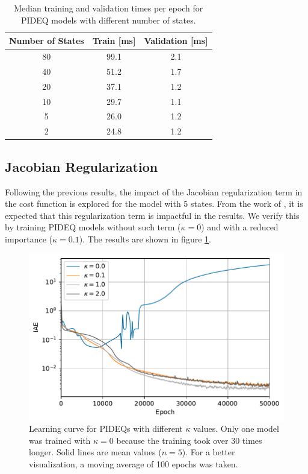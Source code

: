 \begin{table}[h]
    \centering
    \caption{Median training and validation times per epoch for \gls{PIDEQ} models with different number of states.}
    \label{tab:n-states-times}
    \begin{tabular}{ccc}
	\toprule
	\textbf{Number of States} & \textbf{Train} [ms] & \textbf{Validation} [ms] \\ \midrule
	80       & 99.1       & 2.1             \\
	40       & 51.2       & 1.7             \\
	20       & 37.1       & 1.2             \\
	10       & 29.7       & 1.1             \\
	5        & 26.0       & 1.2             \\
	2        & 24.8       & 1.2             \\ \bottomrule
    \end{tabular}
\end{table}

\subsection{Jacobian Regularization}

Following the previous results, the impact of the Jacobian regularization term in the cost function is explored for the model with 5 states.
From the work of \textcite{bai_stabilizing_2021}, it is expected that this regularization term is impactful in the results.
We verify this by training \gls{PIDEQ} models without such term ($\kappa=0$) and with a reduced importance ($\kappa=0.1$).
The results are shown in figure \ref{fig:jac-lamb-iae}.

\begin{figure}[h]
    \centering
    \includegraphics{images/exp_4_iae.pdf}
    \caption{Learning curve for \gls{PIDEQ}s with different $\kappa$ values. Only one model was trained with $\kappa=0$ because the training took over 30 times longer. Solid lines are mean values ($n=5$). For a better visualization, a moving average of 100 epochs was taken.}
    \label{fig:jac-lamb-iae}
\end{figure}

